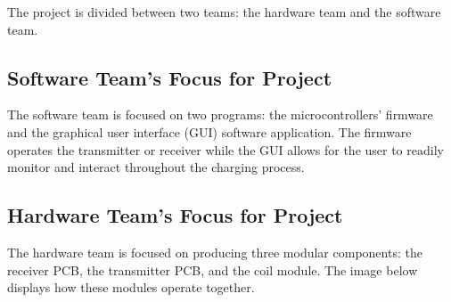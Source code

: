 \documentclass[12pt]{article}
\begin{document}
\indent
The project is divided between two teams: the hardware team and the software team.

\subsection{Software Team's Focus for Project}

\indent \indent
The software team is focused on two programs: the microcontrollers' firmware and the graphical user interface (GUI) software application.  The firmware operates the transmitter or receiver while the GUI allows for the user to readily monitor and interact throughout the charging process.

\hfill
\pagebreak
\hfill

\subsection{Hardware Team's Focus for Project}

\indent \indent
The hardware team is focused on producing three modular components: the receiver PCB, the transmitter PCB, and the coil module.  The image below displays how these modules operate together.

\end{document}

